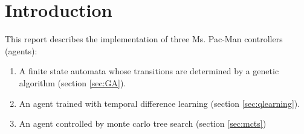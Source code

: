 \section{Introduction}
This report describes the implementation of three Ms. Pac-Man controllers (agents):
\begin{enumerate}
	\item A finite state automata whose transitions are determined by a genetic
		algorithm (section \ref{sec:GA}).
	\item An agent trained with temporal difference learning (section
		\ref{sec:qlearning}).
	\item An agent controlled by monte carlo tree search (section \ref{sec:mcts})
\end{enumerate}
